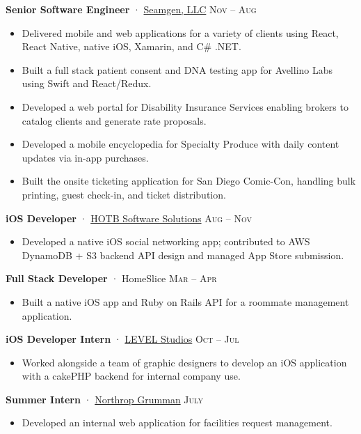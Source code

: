 \documentclass[10pt,a4paper]{article}
\begin{document}
\headedsection
  {\textbf{Senior Software Engineer} · \href{http://seamgen.com}{Seamgen, LLC}}
  {\textsc{Nov  -- Aug }} {%
  \begin{itemize}
    \setlength{\itemsep}{0.4em}
    \item Delivered mobile and web applications for a variety of clients using React, React Native, native iOS, Xamarin, and C\# .NET.
    \item Built a full stack patient consent and DNA testing app for Avellino Labs using Swift and React/Redux.
    \item Developed a web portal for Disability Insurance Services enabling brokers to catalog clients and generate rate proposals.
    \item Developed a mobile encyclopedia for Specialty Produce with daily content updates via in-app purchases.
    \item Built the onsite ticketing application for San Diego Comic-Con, handling bulk printing, guest check-in, and ticket distribution.
  \end{itemize}
}

\headedsection
  {\textbf{iOS Developer} · \href{https://hotbsoftware.com/}{HOTB Software Solutions}}
  {\textsc{Aug  -- Nov }} {%
  \begin{itemize}
    \setlength{\itemsep}{0.4em}
    \item Developed a native iOS social networking app; contributed to AWS DynamoDB + S3 backend API design and managed App Store submission.
  \end{itemize}
}

\headedsection
  {\textbf{Full Stack Developer} · HomeSlice}
  {\textsc{Mar  -- Apr }} {%
  \begin{itemize}
    \setlength{\itemsep}{0.4em}
    \item Built a native iOS app and Ruby on Rails API for a roommate management application.
  \end{itemize}
}

\headedsection
  {\textbf{iOS Developer Intern} · \href{https://level-studios.com/}{LEVEL Studios}}
  {\textsc{Oct  -- Jul }} {%
  \begin{itemize}
    \setlength{\itemsep}{0.4em}
    \item Worked alongside a team of graphic designers to develop an iOS application with a cakePHP backend for internal company use.
  \end{itemize}
}

\headedsection
  {\textbf{Summer Intern} · \href{https://www.northropgrumman.com/}{Northrop Grumman}}
  {\textsc{July }} {%
  \begin{itemize}
    \setlength{\itemsep}{0.4em}
    \item Developed an internal web application for facilities request management.
  \end{itemize}
}
\end{document}
